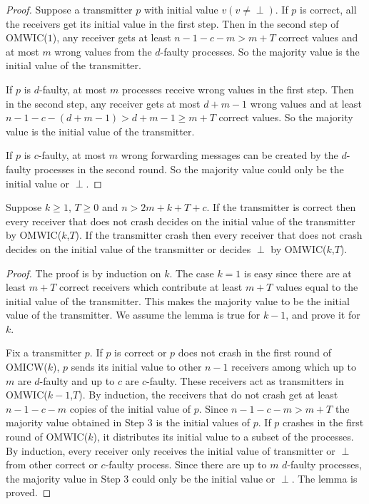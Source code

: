 \begin{proof}
  Suppose a transmitter $p$ with initial value $v ( v \neq \perp )$. If $p$ is
  correct, all the receivers get its initial value in the first step. Then in
  the second step of OMWIC($1$), any receiver gets at least $n-1-c-m>m+T$
  correct values and at most $m$ wrong values from the $d$-faulty processes.
  So the majority value is the initial value of the transmitter.
  
  If $p$ is $d$-faulty, at most $m$ processes receive wrong values in the
  first step. Then in the second step, any receiver gets at most $d+m-1$ wrong
  values and at least $n-1-c- ( d+m-1 ) >d+m-1 \geqslant m+T$ correct
  values. So the majority value is the initial value of the transmitter.
  
  If $p$ is $c$-faulty, at most $m$ wrong forwarding messages can be created
  by the $d$-faulty processes in the second round. So the majority value could
  only be the initial value or $\perp$.
\end{proof}

\begin{lemma}\label{crash:correct}
  Suppose $k \geqslant 1$, $T \geqslant 0$ and $n>2m+k+T+c$. If the
  transmitter is correct then every receiver that does not crash decides on
  the initial value of the transmitter by OMWIC($k$,$T$). If the transmitter
  crash then every receiver that does not crash decides on the initial
  value of the transmitter or decides $\perp$ by OMWIC($k$,$T$).
\end{lemma}

\begin{proof}
  The proof is by induction on $k$. The case $k=1$ is easy since there are at
  least $m+T$ correct receivers which contribute at least $m+T$ values equal
  to the initial value of the transmitter. This makes the majority value to
  be the initial value of the transmitter. We assume the lemma is true for
  $k-1$, and prove it for $k$.
  
  Fix a transmitter $p$. If $p$ is correct or $p$ does not crash in the first
  round of OMICW($k$), $p$ sends its initial value to other $n-1$ receivers
  among which up to $m$ are $d$-faulty and up to $c$ are $c$-faulty. These
  receivers act as transmitters in OMWIC($k-1$,$T$). By induction,
  the receivers that do not crash get at least $n-1-c-m$ copies of the
  initial value of $p$. Since $n-1-c-m>m+T$ the majority value obtained in
  Step $3$ is the initial values of $p$. If $p$ crashes in the first round of
  OMWIC($k$), it distributes its initial value to a subset of the processes.
  By induction, every receiver only receives the initial value of
  transmitter or $\perp$ from other correct or $c$-faulty process. Since
  there are up to $m$ $d$-faulty processes, the majority value in Step $3$
  could only be the initial value or $\perp$. The lemma is proved.
\end{proof}

